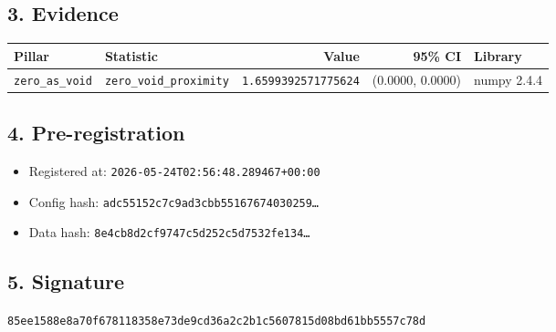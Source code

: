 \documentclass{article}
\begin{document}
\subsection*{3. Evidence}
\begin{tabular}{llrrl}\toprule
\textbf{Pillar} & \textbf{Statistic} & \textbf{Value} & \textbf{95\% CI} & \textbf{Library} \\\midrule
\texttt{zero\_as\_void} & \texttt{zero\_void\_proximity} & \texttt{1.6599392571775624} & (0.0000, 0.0000) & numpy 2.4.4 \\
\bottomrule\end{tabular}
\subsection*{4. Pre-registration}
\begin{itemize}
\item Registered at: \texttt{2026-05-24T02:56:48.289467+00:00}
\item Config hash: \texttt{adc55152c7c9ad3cbb55167674030259\dots}
\item Data hash: \texttt{8e4cb8d2cf9747c5d252c5d7532fe134\dots}
\end{itemize}
\subsection*{5. Signature}
\texttt{85ee1588e8a70f678118358e73de9cd36a2c2b1c5607815d08bd61bb5557c78d}\\
\end{document}
